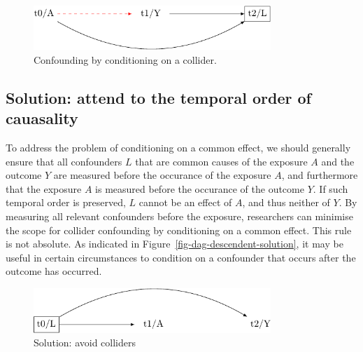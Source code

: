 \documentclass[
  singlecolumn]{report}
\begin{document}
\begin{figure}

{\centering \includegraphics[width=0.8\textwidth,height=\textheight]{causal-dags_files/figure-pdf/fig-dag-common-effect-1.pdf}

}

\caption{\label{fig-dag-common-effect}Confounding by conditioning on a
collider.}

\end{figure}

\hypertarget{solution-attend-to-the-temporal-order-of-cauasality-1}{%
\subsection{Solution: attend to the temporal order of
cauasality}\label{solution-attend-to-the-temporal-order-of-cauasality-1}}

To address the problem of conditioning on a common effect, we should
generally ensure that all confounders \(L\) that are common causes of
the exposure \(A\) and the outcome \(Y\) are measured before the
occurance of the exposure \(A\), and furthermore that the exposure \(A\)
is measured before the occurance of the outcome \(Y\). If such temporal
order is preserved, \(L\) cannot be an effect of \(A\), and thus neither
of \(Y\). By measuring all relevant confounders before the exposure,
researchers can minimise the scope for collider confounding by
conditioning on a common effect. This rule is not absolute. As indicated
in Figure~\ref{fig-dag-descendent-solution}, it may be useful in certain
circumstances to condition on a confounder that occurs after the outcome
has occurred.

\begin{figure}

{\centering \includegraphics[width=0.8\textwidth,height=\textheight]{causal-dags_files/figure-pdf/fig-dag-common-effect-solution-1.pdf}

}

\caption{\label{fig-dag-common-effect-solution}Solution: avoid
colliders}

\end{figure}
\end{document}
